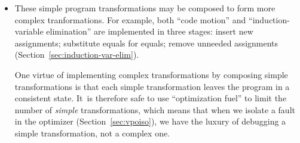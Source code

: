 \documentclass[blockstyle,preprint,nocopyrightspace]{sigplanconf}
\newcommand\secref[1]{Section~\ref{sec:#1}}
\begin{document}
\begin{itemize}
\item
These simple program transformations may be composed to form more
complex tranformations.
For example, both ``code motion'' and ``induction-variable
elimination'' are implemented in three stages: insert new assignments;
substitute equals for equals; remove unneeded assignments
(\secref{induction-var-elim}). 

One virtue of implementing complex transformations by composing simple
transformations is that each simple transformation leaves the program
in a consistent state.
It~is therefore safe to use 
``optimization fuel'' to limit the number of \emph{simple}
transformations, which means that when we isolate a fault in the optimizer
(\secref{vpoiso}), we have the luxury of debugging a simple
 transformation, not a complex one.
\end{itemize}
\end{document}
